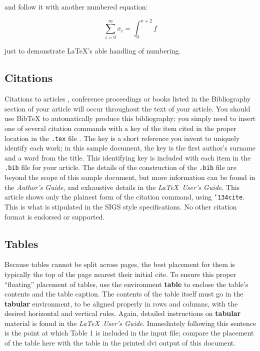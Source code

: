 \documentclass{sig-alternate-05-2015}
\begin{document}
and follow it with another numbered equation:

\begin{equation}
	\sum_{i=0}^{\infty}x_i=\int_{0}^{\pi+2} f
\end{equation}

just to demonstrate \LaTeX's able handling of numbering.

\subsection{Citations}
Citations to articles \cite{bowman:reasoning, clark:pct, braams:babel, herlihy:methodology}, conference proceedings \cite{clark:pct} or books \cite{salas:calculus, Lamport:LaTeX} listed in the Bibliography section of your article will occur throughout the text of your article. You should use BibTeX to automatically produce this bibliography; you simply need to insert one of several citation commands with a key of the item cited in the proper location in the \texttt{.tex} file \cite{Lamport:LaTeX}. The key is a short reference you invent to uniquely identify each work; in this sample document, the key is the first author's surname and a word from the title.  This identifying key is included with each item in the \texttt{.bib} file for your article.
The details of the construction of the \texttt{.bib} file are beyond the scope of this sample document, but more information can be found in the \textit{Author's Guide}, and exhaustive details in the \textit{\LaTeX\ User's Guide}\cite{Lamport:LaTeX}. This article shows only the plainest form of the citation command, using \texttt{{\char'134}cite}. This is what is stipulated in the SIGS style specifications. No other citation format is endorsed or supported.

\subsection{Tables}
Because tables cannot be split across pages, the best placement for them is typically the top of the page nearest their initial cite.  To ensure this proper ``floating'' placement of tables, use the environment \textbf{table} to enclose the table's contents and the table caption.  The contents of the table itself must go in the \textbf{tabular} environment, to be aligned properly in rows and columns, with the desired horizontal and vertical rules.  Again, detailed instructions on \textbf{tabular} material is found in the \textit{\LaTeX\ User's Guide}.
Immediately following this sentence is the point at which  Table 1 is included in the input file; compare the placement of the table here with the table in the printed dvi output of this document.
\end{document}
